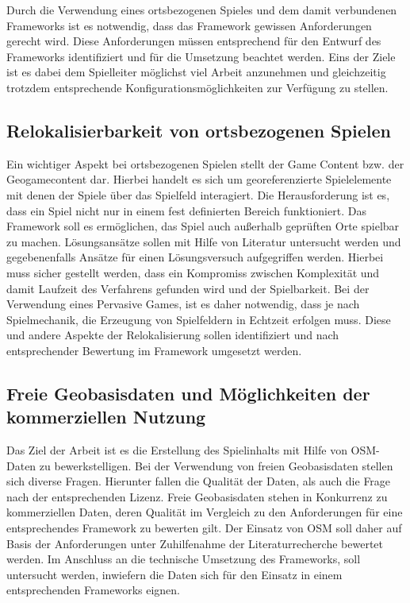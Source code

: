 Durch die Verwendung eines ortsbezogenen Spieles und dem damit verbundenen Frameworks ist es notwendig, dass das Framework gewissen Anforderungen gerecht wird. Diese Anforderungen müssen entsprechend für den Entwurf des Frameworks identifiziert und für die Umsetzung beachtet werden. Eins der Ziele ist es dabei dem Spielleiter möglichst viel Arbeit anzunehmen und gleichzeitig trotzdem entsprechende Konfigurationsmöglichkeiten zur Verfügung zu stellen.

\subsection*{Relokalisierbarkeit von ortsbezogenen Spielen}

Ein wichtiger Aspekt bei ortsbezogenen Spielen stellt der Game Content bzw. der Geogamecontent dar. Hierbei handelt es sich um georeferenzierte Spielelemente mit denen der Spiele über das Spielfeld interagiert. Die Herausforderung ist es, dass ein Spiel nicht nur in einem fest definierten Bereich funktioniert. Das Framework soll es ermöglichen, das Spiel auch außerhalb geprüften Orte spielbar zu machen. Lösungsansätze sollen mit Hilfe von Literatur untersucht werden und gegebenenfalls Ansätze für einen Lösungsversuch aufgegriffen werden. Hierbei muss sicher gestellt werden, dass ein Kompromiss zwischen Komplexität und damit Laufzeit des Verfahrens gefunden wird und der Spielbarkeit. Bei der Verwendung eines Pervasive Games, ist es daher notwendig, dass je nach Spielmechanik, die Erzeugung von Spielfeldern in Echtzeit erfolgen muss. Diese und andere Aspekte der Relokalisierung sollen identifiziert und nach entsprechender Bewertung im Framework umgesetzt werden.

\subsection*{Freie Geobasisdaten und Möglichkeiten der kommerziellen Nutzung}

Das Ziel der Arbeit ist es die Erstellung des Spielinhalts mit Hilfe von OSM-Daten zu bewerkstelligen.
Bei der Verwendung von freien Geobasisdaten stellen sich diverse Fragen. Hierunter fallen die Qualität der Daten, als auch die Frage nach der entsprechenden Lizenz. Freie Geobasisdaten stehen in Konkurrenz zu kommerziellen Daten, deren Qualität im Vergleich zu den Anforderungen  für eine entsprechendes Framework zu bewerten gilt.
Der Einsatz von OSM soll daher auf Basis der Anforderungen unter Zuhilfenahme der Literaturrecherche bewertet werden. Im Anschluss an die  technische Umsetzung des Frameworks, soll untersucht werden, inwiefern die Daten sich für den Einsatz in einem entsprechenden Frameworks eignen.